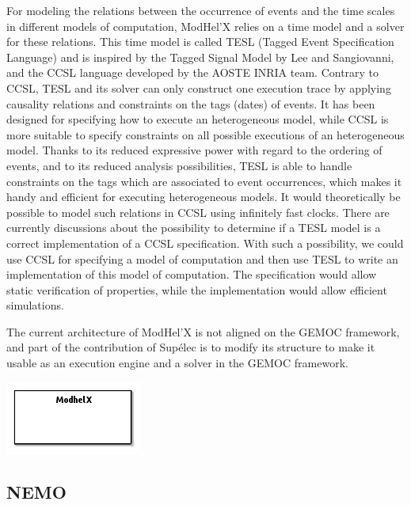 \documentclass{gemoc} %
\begin{document}
For modeling the relations between the occurrence of events and the time scales in different models of computation, ModHel'X relies on a time model and a solver for these relations. This time model is called TESL (Tagged Event Specification Language) and is inspired by the Tagged Signal Model by Lee and Sangiovanni, and the CCSL language developed by the AOSTE INRIA team. Contrary to CCSL, TESL and its solver can only construct one execution trace by applying causality relations and constraints on the tags (dates) of events. It has been designed for specifying how to execute an heterogeneous model, while CCSL is more suitable to specify constraints on all possible executions of an heterogeneous model. Thanks to its reduced expressive power with regard to the ordering of events, and to its reduced analysis possibilities, TESL is able to handle constraints on the tags which are associated to event occurrences, which makes it handy and efficient for executing heterogeneous models. It would theoretically be possible to model such relations in CCSL using infinitely fast clocks. There are currently discussions about the possibility to determine if a TESL model is a correct implementation of a CCSL specification. With such a possibility, we could use CCSL for specifying a model of computation and then use TESL to write an implementation of this model of computation. The specification would allow static verification of properties, while the implementation would allow efficient simulations.

The current architecture of ModHel'X is not aligned on the GEMOC framework, and part of the contribution of Sup\'elec is to modify its structure to make it usable as an execution engine and a solver in the GEMOC framework.


\begin{center}
\includegraphics*[trim=0.0cm 0.0cm 0cm 0.0cm, clip=true]{../images/generated/Generated_Modhel_X.png}
\end{center}




\subsection{NEMO}
\label{sec:NEMO}
\end{document}
